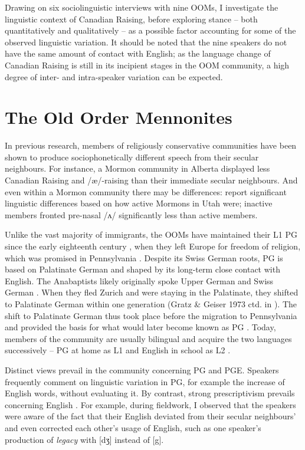 \documentclass[output=paper]{langscibook}
\begin{document}
Drawing on six sociolinguistic interviews with nine \glspl*{OOM}, I investigate the linguistic context of Canadian Raising, before exploring stance – both quantitatively and qualitatively – as a possible factor accounting for some of the observed linguistic variation. It should be noted that the nine speakers do not have the same amount of contact with English; as the language change of Canadian Raising is still in its incipient stages in the \gls*{OOM} community, a high degree of inter- and intra-speaker variation can be expected.


\section{The Old Order Mennonites}
In previous research, members of religiously conservative communities have been shown to produce sociophonetically different speech from their secular neighbours. For instance, a Mormon community in Alberta displayed less Canadian Raising \citep{meechan_mormon_1999} and /æ/-raising \citep{rosen_vowel_2015} than their immediate secular neighbours. And even within a Mormon community there may be differences: \citet{baker-smemoe_linguistic_2015} report significant linguistic differences based on how active Mormons in Utah were; inactive members fronted pre-nasal /ʌ/ significantly less than active members. 

Unlike the vast majority of immigrants, the \glspl*{OOM} have maintained their L1 \gls*{PG} since the early eighteenth century \citep[216]{draper_mennonites_2010}, when they left Europe for freedom of religion, which was promised in Pennsylvania \citep[131–132]{frantz_religion_2017}. Despite its Swiss German roots, \gls*{PG} is based on Palatinate German and shaped by its long-term close contact with English. The Anabaptists likely originally spoke Upper German and Swiss German \citep[317]{raith_relig_1996}. 
When they fled Zurich and were staying in the Palatinate, they shifted to Palatinate German within one generation (Gratz \& Geiser 1973 ctd. in \cite[317]{raith_relig_1996}).
The shift to Palatinate German thus took place before the migration to Pennsylvania and provided the basis for what would later become known as \gls*{PG} \citep[316]{raith_relig_1996}.
Today, members of the community are usually bilingual and acquire the two languages successively – \gls*{PG} at home as L1 and English in school as L2 \citep[85–86]{burridge_throw_1998}.

Distinct views prevail in the community concerning \gls*{PG} and \gls*{PGE}. Speakers frequently comment on linguistic variation in \gls*{PG}, for example the increase of English words, without evaluating it. By contrast, strong prescriptivism prevails concerning English \citep[85]{burridge_throw_1998}. For example, during fieldwork, I observed that the speakers were aware of the fact that their English deviated from their secular neighbours’ and even corrected each other’s usage of English, such as one speaker’s production of \textit{legacy} with [dʒ] instead of [g]. 
\end{document}
